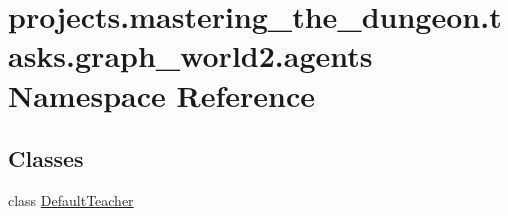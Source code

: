 \hypertarget{namespaceprojects_1_1mastering__the__dungeon_1_1tasks_1_1graph__world2_1_1agents}{}\section{projects.\+mastering\+\_\+the\+\_\+dungeon.\+tasks.\+graph\+\_\+world2.\+agents Namespace Reference}
\label{namespaceprojects_1_1mastering__the__dungeon_1_1tasks_1_1graph__world2_1_1agents}
\subsection*{Classes}
\begin{DoxyCompactItemize}
\item 
class \hyperlink{classprojects_1_1mastering__the__dungeon_1_1tasks_1_1graph__world2_1_1agents_1_1DefaultTeacher}{Default\+Teacher}
\end{DoxyCompactItemize}
